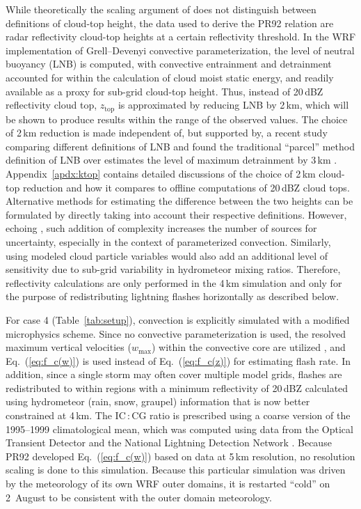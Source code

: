 While theoretically the scaling argument of \citet{Vonnegut:1963aa} does not
distinguish between definitions of cloud-top height, the data used to derive
the PR92 relation are radar reflectivity cloud-top heights at a certain
reflectivity threshold. In the WRF implementation of Grell--Devenyi convective
parameterization, the level of neutral buoyancy (LNB) is computed, with
convective entrainment and detrainment accounted for within the calculation
of cloud moist static energy, and readily available as a proxy for sub-grid
cloud-top height. Thus, instead of 20\,\unit{dBZ} reflectivity cloud top,
$z_{\mathrm{top}}$ is approximated by reducing LNB by 2\,\unit{km}, which
will be shown to produce results within the range of the observed values. The
choice of 2\,\unit{km} reduction is made independent of, but supported by, a
recent study comparing different definitions of LNB and found the traditional
``parcel'' method definition of LNB over estimates the level of maximum
detrainment by 3\,\unit{km} \citep{Takahashi:2012uq}. Appendix~\ref{apdx:ktop} contains detailed discussions of the choice of 2\,\unit{km}
cloud-top reduction and how it compares to offline computations of
20\,\unit{dBZ} cloud tops. Alternative methods for estimating the difference
between the two heights can be formulated by directly taking into account
their respective definitions. However, echoing \cite{Barthe:2010uq}, such
addition of complexity increases the number of sources for uncertainty,
especially in the context of parameterized convection. Similarly, using
modeled cloud particle variables would also add an additional level of
sensitivity due to sub-grid variability in hydrometeor mixing ratios.
Therefore, reflectivity calculations are only performed in the 4\,\unit{km}
simulation and only for the purpose of redistributing lightning flashes
horizontally as described below.

For case 4 (Table~\ref{tab:setup}), convection is explicitly simulated with a
modified \citet{Lin:1983zr} microphysics scheme. Since no convective
parameterization is used, the resolved maximum vertical velocities
($w_{\max}$) within the convective core are utilized \citep{Barth:2012qf},
and Eq.~(\ref{eq:f_c(w)}) is used instead of Eq.~(\ref{eq:f_c(z)}) for
estimating flash rate. In addition, since a single storm may often cover
multiple model grids, flashes are redistributed to within regions with a
minimum reflectivity of 20\,\unit{dBZ} calculated using hydrometeor (rain,
snow, graupel) information that is now better constrained at 4\,\unit{km}.
The IC\,:\,CG ratio is prescribed using a coarse version of the
\cite{Boccippio:2001ys} 1995--1999 climatological mean, which was computed
using data from the Optical Transient Detector
\citep[OTD;][]{Christian:1996aa} and the National Lightning Detection Network
\citep[NLDN;][]{5173582}. Because PR92 developed Eq.~(\ref{eq:f_c(w)}) based
on data at 5\,\unit{km} resolution, no resolution scaling is done to this
simulation. Because this particular simulation was driven by the meteorology
of its own WRF outer domains, it is restarted ``cold'' on 2~August to be
consistent with the outer domain meteorology.


